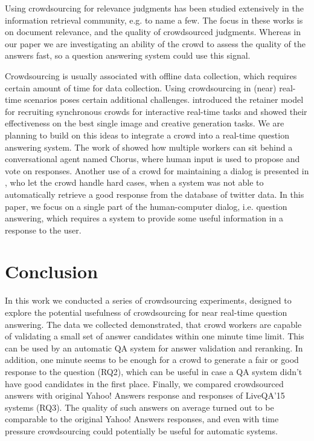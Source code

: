 \documentclass[11pt,letterpaper]{article}
\begin{document}
Using crowdsourcing for relevance judgments has been studied extensively in the information retrieval community, e.g. \cite{Alonso:2008:CRE:1480506.1480508,alonso2011design,grady2010crowdsourcing} to name a few.
The focus in these works is on document relevance, and the quality of crowdsourced judgments.
Whereas in our paper we are investigating an ability of the crowd to assess the quality of the answers fast, so a question answering system could use this signal.

Crowdsourcing is usually associated with offline data collection, which requires certain amount of time for data collection.
Using crowdsourcing in (near) real-time scenarios poses certain additional challenges.
\cite{bernstein2011crowds} introduced the retainer model for recruiting synchronous crowds for interactive real-time tasks and showed their effectiveness on the best single image and creative generation tasks.
We are planning to build on this ideas to integrate a crowd into a real-time question answering system.
The work of \cite{Lasecki:2013:CCC:2501988.2502057} showed how multiple workers can sit behind a conversational agent named Chorus, where human input is used to propose and vote on responses. 
Another use of a crowd for maintaining a dialog is presented in \cite{Bessho:2012:DSU:2392800.2392841}, who let the crowd handle hard cases, when a system was not able to automatically retrieve a good response from the database of twitter data.
In this paper, we focus on a single part of the human-computer dialog, i.e. question answering, which requires a system to provide some useful information in a response to the user.


\section{Conclusion}
\label{sec:conclusion}

In this work we conducted a series of crowdsourcing experiments, designed to explore the potential usefulness of crowdsourcing for near real-time question answering.
The data we collected demonstrated, that crowd workers are capable of validating a small set of answer candidates within one minute time limit.
This can be used by an automatic QA system for answer validation and reranking.
In addition, one minute seems to be enough for a crowd to generate a fair or good response to the question (RQ2), which can be useful in case a QA system didn't have good candidates in the first place.
Finally, we compared crowdsourced answers with original Yahoo! Answers response and responses of LiveQA'15 systems (RQ3).
The quality of such answers on average turned out to be comparable to the original Yahoo! Answers responses, and even with time pressure crowdsourcing could potentially be useful for automatic systems.




\end{document}
